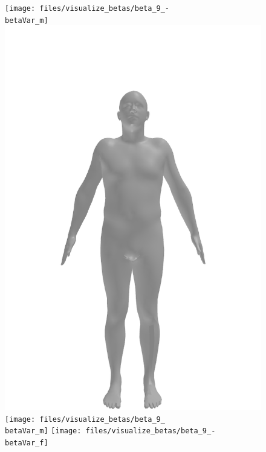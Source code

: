 \begin{figure}[ht!]
    \centering

    \begin{minipage}[b]{\textwidth}
        \centering
        \texttt{[image: files/visualize\_betas/beta\_9\_-\\betaVar\_m]}
        \includegraphics[width=\imgWidth]{files/visualize_betas/baseline_m}
        \texttt{[image: files/visualize\_betas/beta\_9\_\\betaVar\_m]}
        \linebreak
        \texttt{[image: files/visualize\_betas/beta\_9\_-\\betaVar\_f]}

\end{minipage}
\end{figure}
